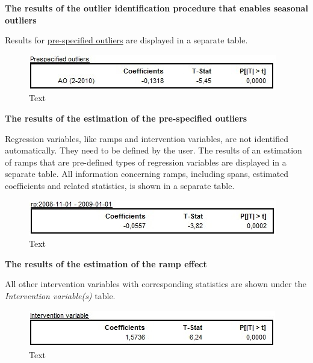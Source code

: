 \documentclass[
  letterpaper,
  DIV=11,
  numbers=noendperiod]{scrreprt}
\begin{document}
\textbf{The results of the outlier identification procedure that enables
seasonal outliers}

Results for \protect\hyperlink{regression}{pre-specified outliers} are
displayed in a separate table.

\begin{figure}

{\centering \includegraphics{./All_images/image36_RMSB.jpg}

}

\caption{Text}

\end{figure}

\textbf{The results of the estimation of the pre-specified outliers}

Regression variables, like ramps and intervention variables, are not
identified automatically. They need to be defined by the user. The
results of an estimation of ramps that are pre-defined types of
regression variables are displayed in a separate table. All information
concerning ramps, including spans, estimated coefficients and related
statistics, is shown in a separate table.

\begin{figure}

{\centering \includegraphics{./All_images/image37_RMSB.jpg}

}

\caption{Text}

\end{figure}

\textbf{The results of the estimation of the ramp effect}

All other intervention variables with corresponding statistics are shown
under the \emph{Intervention variable(s)} table.

\begin{figure}

{\centering \includegraphics{./All_images/image38_RMSB.jpg}

}

\caption{Text}

\end{figure}
\end{document}
